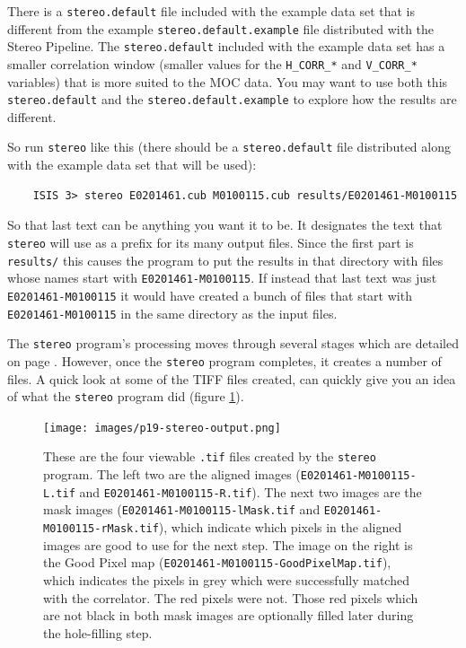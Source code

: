 There is a \texttt{stereo.default} file included with the example
data set that is different from the example \texttt{stereo.default.example}
file distributed with the Stereo Pipeline.  The \texttt{stereo.default}
included with the example data set has a smaller correlation window
(smaller values for the \texttt{H\_CORR\_*} and \texttt{V\_CORR\_*}
variables) that is more suited to the MOC data.  You may want to
use both this \texttt{stereo.default} and the
\texttt{stereo.default.example} to explore how the results are
different.

So run \texttt{stereo} like this (there should be a
\texttt{stereo.default} file distributed along with the example
data set that will be used):

\begin{verbatim}
    ISIS 3> stereo E0201461.cub M0100115.cub results/E0201461-M0100115
\end{verbatim}
\noindent
So that last text can be anything you want it to be.  It designates
the text that \texttt{stereo} will use as a prefix for its many
output files.  Since the first part is \texttt{results/} this causes
the program to put the results in that directory with files whose
names start with \texttt{E0201461-M0100115}.  If instead that last
text was just \texttt{E0201461-M0100115} it would have created a
bunch of files that start with \texttt{E0201461-M0100115} in the
same directory as the input files.

The \texttt{stereo} program's processing moves through several
stages which are detailed on page \pageref{entrypoints}.  However,
once the \texttt{stereo} program completes, it creates a number of
files.  A quick look at some of the TIFF files created, can quickly
give you an idea of what the \texttt{stereo} program did (figure
\ref{p19-stereo-output}).


\begin{figure}
\begin{center}
\texttt{[image: images/p19-stereo-output.png]}
\caption[P19 stereo output images]{
    \label{p19-stereo-output}
	These are the four viewable \texttt{.tif} files created by
	the \texttt{stereo} program.  The left two are the aligned
	images (\texttt{E0201461-M0100115-L.tif} and
	\texttt{E0201461-M0100115-R.tif}).  The next two images are
	the mask images (\texttt{E0201461-M0100115-lMask.tif} and
	\texttt{E0201461-M0100115-rMask.tif}), which indicate which
	pixels in the aligned images are good to use for the next
	step.  The image on the right is the Good Pixel map
	(\texttt{E0201461-M0100115-GoodPixelMap.tif}), which indicates
	the pixels in grey which were successfully matched with the
	correlator.  The red pixels were not.  Those red pixels which 
	are not black in both mask images are optionally filled later
	during the hole-filling step.
    }
\end{center}
\end{figure}

